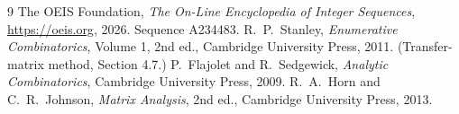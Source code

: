\documentclass[11pt,a4paper]{article}
\theoremstyle{plain}
\theoremstyle{definition}
\begin{document}
\begin{thebibliography}{9}
 The OEIS Foundation, \emph{The On-Line Encyclopedia of Integer
Sequences}, \url{https://oeis.org}, 2026. Sequence A234483.
 R.~P.~Stanley, \emph{Enumerative Combinatorics}, Volume 1, 2nd ed.,
Cambridge University Press, 2011. (Transfer-matrix method, Section 4.7.)
 P.~Flajolet and R.~Sedgewick, \emph{Analytic Combinatorics}, Cambridge
University Press, 2009.
 R.~A.~Horn and C.~R.~Johnson, \emph{Matrix Analysis}, 2nd ed., Cambridge
University Press, 2013.
\end{thebibliography}
\end{document}

